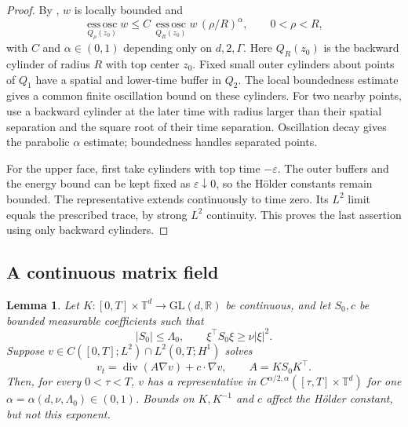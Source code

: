 \documentclass[11pt]{article}
\newtheorem{lemma}[theorem]{Lemma}
\newcommand{\T}{\mathbb T}
\newcommand{\R}{\mathbb R}
\newcommand{\diver}{\operatorname{div}}
\newcommand{\osc}{\operatorname*{ess\,osc}}
\begin{document}
\begin{proof}
By \cite[Theorems 2.1 and 5.1]{Liao}, $w$ is locally bounded and
\[
 \osc_{Q_\rho(z_0)}w
 \le C\,\osc_{Q_R(z_0)}w\,(\rho/R)^\alpha,
 \qquad 0<\rho<R,
\]
with $C$ and $\alpha\in(0,1)$ depending only on $d,2,\Gamma$.
Here $Q_R(z_0)$ is the backward cylinder of radius $R$ with top center
$z_0$. Fixed small outer cylinders about points of $Q_1$ have a spatial
and lower-time buffer in $Q_2$. The local boundedness estimate gives a
common finite oscillation bound on these cylinders. For two nearby points,
use a backward cylinder at the later time with radius larger than their
spatial separation and the square root of their time separation.
Oscillation decay gives the parabolic $\alpha$ estimate; boundedness
handles separated points.

For the upper face, first take cylinders with top time $-\varepsilon$.
The outer buffers and the energy bound can be kept fixed as
$\varepsilon\downarrow0$, so the H\"older constants remain bounded.
The representative extends continuously to time zero. Its $L^2$ limit
equals the prescribed trace, by strong $L^2$ continuity. This proves the
last assertion using only backward cylinders.
\end{proof}

\subsection{A continuous matrix field}

\begin{lemma}\label{lem:frame}
Let $K:[0,T]\times\T^d\to\mathrm{GL}(d,\R)$ be continuous, and let
$S_0,c$ be bounded measurable coefficients such that
\[
 |S_0|\le\Lambda_0,\qquad
 \xi^\top S_0\xi\ge\nu|\xi|^2.
\]
Suppose $v\in C([0,T];L^2)\cap L^2(0,T;H^1)$ solves
\begin{equation}\label{eq:frame}
 v_t=\diver(A\nabla v)+c\cdot\nabla v,
 \qquad A=KS_0K^\top.
\end{equation}
Then, for every $0<\tau<T$, $v$ has a representative in
$C^{\alpha/2,\alpha}([\tau,T]\times\T^d)$ for one
$\alpha=\alpha(d,\nu,\Lambda_0)\in(0,1)$.
Bounds on $K,K^{-1}$ and $c$ affect the H\"older constant, but not
this exponent.
\end{lemma}
\end{document}
